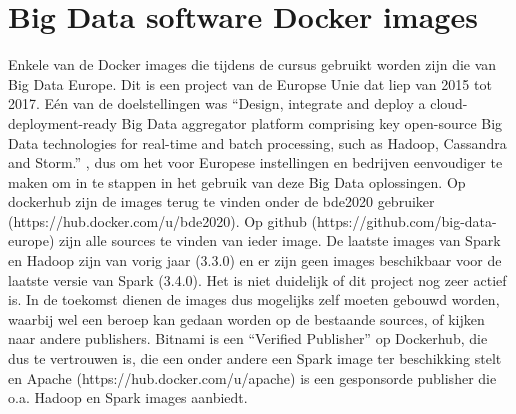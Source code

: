 \section{Big Data software Docker images}
Enkele van de Docker images die tijdens de cursus gebruikt worden zijn die van Big Data Europe. Dit is een project van de Europse Unie dat liep van 2015 tot 2017.
Eén van de doelstellingen was ``Design, integrate and deploy a cloud-deployment-ready Big Data aggregator platform comprising key open-source Big Data technologies for real-time and batch processing, such as Hadoop, Cassandra and Storm.'' \textcite{Commission2022}, dus om het voor Europese instellingen en bedrijven eenvoudiger te maken om in te stappen in het gebruik van deze Big Data oplossingen.
\newline
\sloppypar Op dockerhub zijn de images terug te vinden onder de bde2020 gebruiker (https://hub.docker.com/u/bde2020). Op github (https://github.com/big-data-europe) zijn alle sources te vinden van ieder image.
\newline
De laatste images van Spark en Hadoop zijn van vorig jaar (3.3.0) en er zijn geen images beschikbaar voor de laatste versie van Spark (3.4.0). Het is niet duidelijk of dit project nog zeer actief is. In de toekomst dienen de images dus mogelijks zelf moeten gebouwd worden, waarbij wel een beroep kan gedaan worden op de bestaande sources, of kijken naar andere publishers.
\newline
\sloppypar Bitnami is een ``Verified Publisher'' op Dockerhub, die dus te vertrouwen is, die een onder andere een Spark image ter beschikking stelt en Apache (https://hub.docker.com/u/apache) is een gesponsorde publisher die o.a. Hadoop en Spark images aanbiedt.


